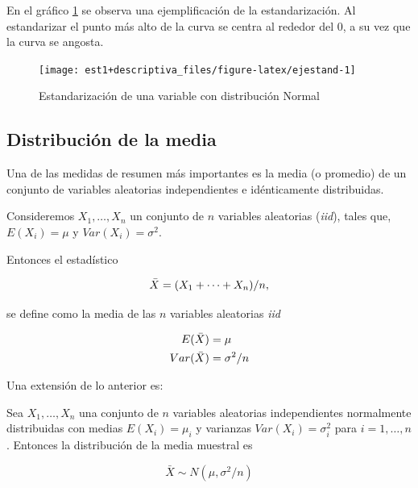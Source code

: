 \documentclass[
  11pt,
]{book}
\theoremstyle{definition}
\theoremstyle{definition}
\theoremstyle{definition}
\theoremstyle{definition}
\theoremstyle{remark}
\begin{document}
En el gráfico \ref{fig:ejestand} se observa una ejemplificación de la estandarización. Al estandarizar el punto más alto de la curva se centra al rededor del 0, a su vez que la curva se angosta.

\begin{figure}

{\centering \texttt{[image: est1+descriptiva\_files/figure-latex/ejestand-1]} 

}

\caption{Estandarización de una variable con distribución Normal}\label{fig:ejestand}
\end{figure}

\subsection{Distribución de la media}\label{distribucionesmuestrales-media-distribucionmedia}

Una de las medidas de resumen más importantes es la media (o promedio) de un conjunto de variables aleatorias independientes e idénticamente distribuidas.

Consideremos \(X_1, \ldots , X_n\) un conjunto de \(n\) variables aleatorias (\emph{iid}), tales que, \(E(X_i) = \mu\) y \(Var(X_i) = \sigma^2\).

Entonces el estadístico

\begin{equation}
\notag
\bar{X} = (X_1 + \cdots + X_n)/n,
\end{equation}

se define como la media de las \(n\) variables aleatorias \emph{iid}

\begin{equation}
\notag
\begin{split}
E(\bar{X}) &= \mu\\
Var(\bar{X}) &= \sigma^2/n
\end{split}
\end{equation}

Una extensión de lo anterior es:

Sea \(X_1, \ldots , X_n\) una conjunto de \(n\) variables aleatorias independientes normalmente distribuidas con medias \(E(X_i) = \mu_i\) y varianzas \(Var(X_i) = \sigma_i^2\) para \(i=1,\ldots,n\). Entonces la distribución de la media muestral es

\begin{equation}
\bar{X}\sim N(\mu,\sigma^2/n)
\label{eq:distMedia}
\end{equation}
\end{document}
